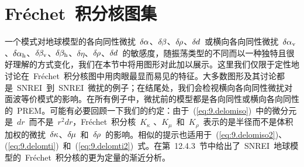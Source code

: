 \section{Fr\'{e}chet~积分核图集}
%
%

一个模式对地球模型的各向同性微扰~$\delta\hspace{-0.1 mm}\alpha$、$\delta\hspace{-0.2 mm}\beta$、$\delta\hspace{-0.2 mm}\rho$、$\delta\hspace{-0.1 mm}d$~或横向各向同性微扰~$\delta\hspace{-0.1 mm}\alpha_{\rm v}$、$\delta\hspace{-0.1 mm}\alpha_{\rm h}$、$\delta\hspace{-0.2 mm}\beta_{\rm v}$、$\delta\hspace{-0.2 mm}\beta_{\rm h}$、$\delta\eta$、$\delta\hspace{-0.2 mm}\rho$、$\delta\hspace{-0.1 mm}d$~的敏感度，随振荡类型的不同而以一种独特且很好理解的方式变化，我们在本节中将用图形对此加以展示。这里我们仅限于定性地讨论在~Fr\'{e}chet~积分核图中用肉眼最显而易见的特征。大多数图形及其讨论都是~SNREI~到~SNREI~微扰的例子；在结尾处，我们会检视横向各向同性微扰对面波等价模式的影响。在所有例子中，微扰前的模型都是各向同性或横向各向同性的~PREM。可能有必要回顾一下我们的约定：由于~(\ref{eq:9.delomiso})~中的微分元是~$dr$~而不是~$r^2dr$，Fr\'{e}chet~积分核~$K_{\kappa}$
、$K_{\mu}$~和~$K_{\rho}$~表示的是半径而不是体积加权的微扰~$\delta\hspace{-0.1 mm}\kappa$、$\delta\hspace{-0.2 mm}\mu$~和~$\delta\hspace{-0.2 mm}\rho$~的影响。相似的提示也适用于~(\ref{eq:9.delomiso2})、(\ref{eq:9.delomti})~和~(\ref{eq:9.delomti2})~式。在第~12.4.3~节中给出了~SNREI~地球模型的~Fr\'{e}chet~积分核的更为定量的渐近分析。

